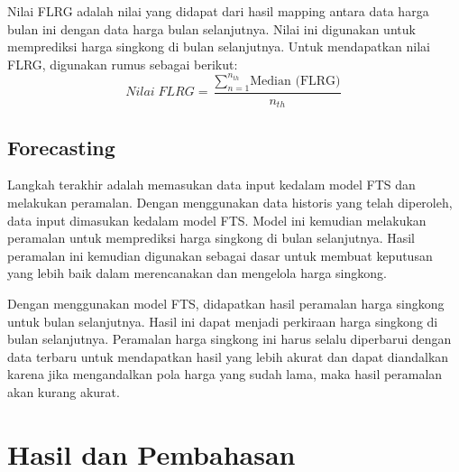 \documentclass[conference]{IEEEtran}
\begin{document}
Nilai FLRG adalah nilai yang didapat dari hasil mapping antara data harga bulan ini dengan data harga bulan selanjutnya. Nilai ini digunakan untuk memprediksi harga singkong di bulan selanjutnya.
Untuk mendapatkan nilai FLRG, digunakan rumus sebagai berikut:
\begin{equation}
    Nilai\; FLRG = \frac{\sum_{n=1}^{n_{th}} \text{Median (FLRG)}}{n_{th}}
\end{equation}
    
    
\subsection{Forecasting}
Langkah terakhir adalah memasukan data input kedalam model FTS dan melakukan peramalan. Dengan menggunakan data historis yang telah diperoleh, data input dimasukan kedalam model FTS. Model ini kemudian melakukan peramalan untuk memprediksi harga singkong di bulan selanjutnya. Hasil peramalan ini kemudian digunakan sebagai dasar untuk membuat keputusan yang lebih baik dalam merencanakan dan mengelola harga singkong. 

Dengan menggunakan model FTS, didapatkan hasil peramalan harga singkong untuk bulan selanjutnya. Hasil ini dapat menjadi perkiraan harga singkong di bulan selanjutnya. Peramalan harga singkong ini harus selalu diperbarui dengan data terbaru untuk mendapatkan hasil yang lebih akurat dan dapat diandalkan karena jika mengandalkan pola harga yang sudah lama, maka hasil peramalan akan kurang akurat.


\section{Hasil dan Pembahasan}
\end{document}
